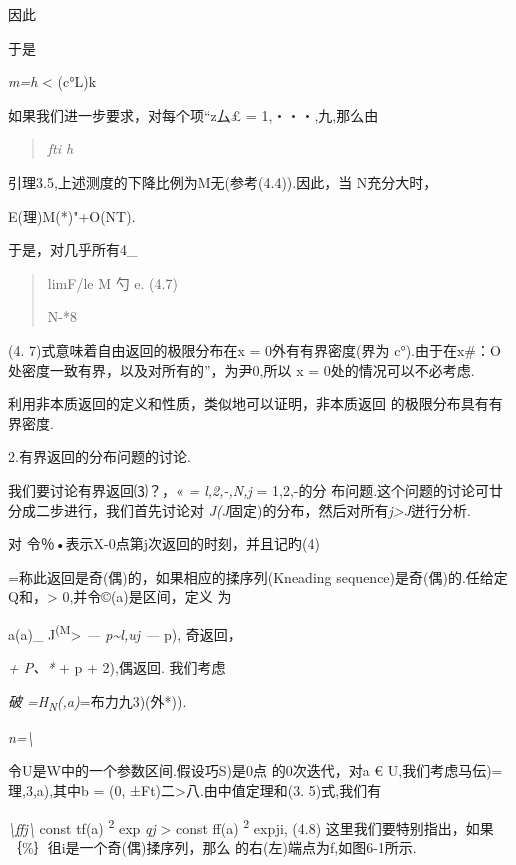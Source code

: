因此

于是

\emph{m=h} \textless{} (c°\textbar{}L\textbar{})k

如果我们进一步要求，对每个项``z厶£ = 1,・・・,九,那么由

\begin{quote}
\emph{fti h}
\end{quote}

引理3.5,上述测度的下降比例为M无(参考(4.4)).因此，当 N充分大时，

E(理)M(*)"+O(NT).

于是，对几乎所有4\_

\begin{quote}
\textbar{}\textbar{} limF/le M 勺 e. (4.7)

N-*8
\end{quote}

(4. 7)式意味着自由返回的极限分布在x = 0外有有界密度(界为
c°).由于在x\#：O处密度一致有界，以及对所有的''，为尹0,所以 x =
0处的情况可以不必考虑.

利用非本质返回的定义和性质，类似地可以证明，非本质返回
的极限分布具有有界密度.

2.有界返回的分布问题的讨论.

我们要讨论有界返回⑶？，« \emph{= l,2,-,N,j} = 1,2,-的分
布问题.这个问题的讨论可廿分成二步进行，我们首先讨论对
\emph{J(J}固定)的分布，然后对所有\emph{j\textgreater{}J}迸行分析.

对 令％•表示X-0点第j次返回的时刻，并且记旳(4)

=称此返回是奇(偶)的，如果相应的揉序列(Kneading
sequence)是奇(偶)的.任给定Q和，\textgreater{} 0,并令©(a)是区间，定义 为

a(a)\_ J\textsuperscript{(M}\textgreater{} \emph{---
p\textasciitilde{}l,uj ---} p), 奇返回，

\emph{+ P、*} + p + 2),偶返回. 我们考虑

\emph{破 =H\textsubscript{N}(,a)}=布力九3)(外*)).

\emph{n=\textbackslash{}}

令U是W中的一个参数区间.假设巧S)是0点 的0次迭代，对a €
U,我们考虑马伝)=理,3,a),其中b = (0,
±Ft)二\textgreater{}八.由中值定理和(3. 5)式,我们有

\emph{\textbackslash{}ffj\textbackslash{}} const \textbar{}tf(a)
\textbar{}\textsuperscript{2} exp \emph{qj} \textgreater{} const
\textbar{}ff(a) \textbar{}\textsuperscript{2} expji, (4.8)
这里我们要特别指出，如果｛\%｝徂i是一个奇(偶)揉序列，那么
的右(左)端点为f,如图6-1所示.

